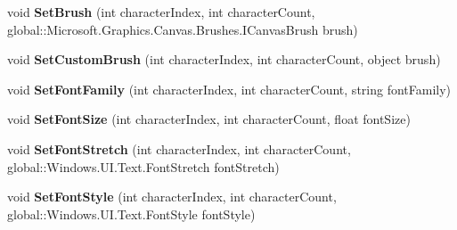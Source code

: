 \begin{DoxyCompactItemize}
\item 
\mbox{\label{class_microsoft_1_1_graphics_1_1_canvas_1_1_text_1_1_canvas_text_layout_a164e35e922e29d39c04fdf4a859201ff}} 
void {\bfseries Set\+Brush} (int character\+Index, int character\+Count, global\+::\+Microsoft.\+Graphics.\+Canvas.\+Brushes.\+I\+Canvas\+Brush brush)
\item 
\mbox{\label{class_microsoft_1_1_graphics_1_1_canvas_1_1_text_1_1_canvas_text_layout_a9ac1050fa038c2c1ebceaa61d479feb0}} 
void {\bfseries Set\+Custom\+Brush} (int character\+Index, int character\+Count, object brush)
\item 
\mbox{\label{class_microsoft_1_1_graphics_1_1_canvas_1_1_text_1_1_canvas_text_layout_ad4c9f30ce630b285c5de4328a5697eef}} 
void {\bfseries Set\+Font\+Family} (int character\+Index, int character\+Count, string font\+Family)
\item 
\mbox{\label{class_microsoft_1_1_graphics_1_1_canvas_1_1_text_1_1_canvas_text_layout_a2bd8d5f600cfc5fd4da25693e6735264}} 
void {\bfseries Set\+Font\+Size} (int character\+Index, int character\+Count, float font\+Size)
\item 
\mbox{\label{class_microsoft_1_1_graphics_1_1_canvas_1_1_text_1_1_canvas_text_layout_ad50a824a4bfd07dcc357647441ef7b28}} 
void {\bfseries Set\+Font\+Stretch} (int character\+Index, int character\+Count, global\+::\+Windows.\+U\+I.\+Text.\+Font\+Stretch font\+Stretch)
\item 
\mbox{\label{class_microsoft_1_1_graphics_1_1_canvas_1_1_text_1_1_canvas_text_layout_aa0cb0934c99cab9f6563ad3c1652fe2d}} 
void {\bfseries Set\+Font\+Style} (int character\+Index, int character\+Count, global\+::\+Windows.\+U\+I.\+Text.\+Font\+Style font\+Style)
\item 
\mbox{\label{class_microsoft_1_1_graphics_1_1_canvas_1_1_text_1_1_canvas_text_layout_a6afdb440ee71967887652cfeb495a190}} 

\end{DoxyCompactItemize}
